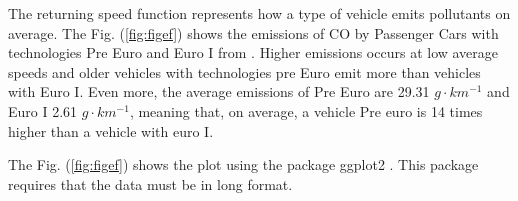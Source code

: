 \documentclass[12pt,graybox,envcountchap,sectrefs]{krantz}
\makeatletter
\newenvironment{Shaded}{\begin{snugshade}}{\end{snugshade}}
\newcommand{\KeywordTok}[1]{\textcolor[rgb]{0.13,0.29,0.53}{\textbf{#1}}}
\newcommand{\DataTypeTok}[1]{\textcolor[rgb]{0.13,0.29,0.53}{#1}}
\newcommand{\DecValTok}[1]{\textcolor[rgb]{0.00,0.00,0.81}{#1}}
\newcommand{\StringTok}[1]{\textcolor[rgb]{0.31,0.60,0.02}{#1}}
\newcommand{\OperatorTok}[1]{\textcolor[rgb]{0.81,0.36,0.00}{\textbf{#1}}}
\newcommand{\NormalTok}[1]{#1}
\newenvironment{kframe}{%
\medskip{}
\setlength{\fboxsep}{.8em}
 \def\at@end@of@kframe{}%
 \ifinner\ifhmode%
  \def\at@end@of@kframe{\end{minipage}}%
  \begin{minipage}{\columnwidth}%
 \fi\fi%
 \def\FrameCommand##1{\hskip\@totalleftmargin \hskip-\fboxsep
 \colorbox{shadecolor}{##1}\hskip-\fboxsep
     \hskip-\linewidth \hskip-\@totalleftmargin \hskip\columnwidth}%
 \MakeFramed {\advance\hsize-\width
   \@totalleftmargin\z@ \linewidth\hsize
   \@setminipage}}%
 {\par\unskip\endMakeFramed%
 \at@end@of@kframe}
\renewenvironment{Shaded}{\begin{kframe}}{\end{kframe}}
\theoremstyle{definition}
\theoremstyle{definition}
\theoremstyle{definition}
\theoremstyle{remark}
\makeatother
\begin{document}
The returning speed function represents how a type of vehicle emits
pollutants on average. The Fig. (\ref{fig:figef}) shows the emissions of
CO by Passenger Cars with technologies Pre Euro and Euro I from
\citet{NtziachristosSamaras2016}. Higher emissions occurs at low average
speeds and older vehicles with technologies pre Euro emit more than
vehicles with Euro I. Even more, the average emissions of Pre Euro are
29.31 \(g \cdot km^{-1}\) and Euro I 2.61 \(g \cdot km^{-1}\), meaning
that, on average, a vehicle Pre euro is 14 times higher than a vehicle
with euro I.

The Fig. (\ref{fig:figef}) shows the plot using the package ggplot2
\citep{ggplot2}. This package requires that the data must be in long
format.

\begin{Shaded}
\end{Shaded}
\end{document}
